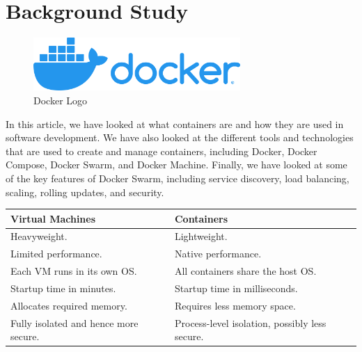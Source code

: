 \section{Background Study}

\begin{figure}[h]
    \centering
    \includegraphics[width=0.7\textwidth]{./resources/images/horizontal-logo-monochromatic-white.png}
    \caption{Docker Logo}
    \label{fig:docker-logo}
\end{figure}

\clearpage

In this article, we have looked at what containers are and how they are used in software development. We have also looked at the different tools and technologies that are used to create and manage containers, including Docker, Docker Compose, Docker Swarm, and Docker Machine. Finally, we have looked at some of the key features of Docker Swarm, including service discovery, load balancing, scaling, rolling updates, and security.

\begin{table}[h]
    \begin{tabular}{|l|l|}
    \hline
    \textbf{Virtual Machines}             & \textbf{Containers}                            \\ \hline
    Heavyweight.                          & Lightweight.                                   \\
    Limited performance.                  & Native performance.                            \\
    Each VM runs in its own OS.           & All containers share the host OS.              \\
    Startup time in minutes.              & Startup time in milliseconds.                  \\
    Allocates required memory.            & Requires less memory space.                    \\
    Fully isolated and hence more secure. & Process-level isolation, possibly less secure. \\ \hline
    \end{tabular}
\end{table}
